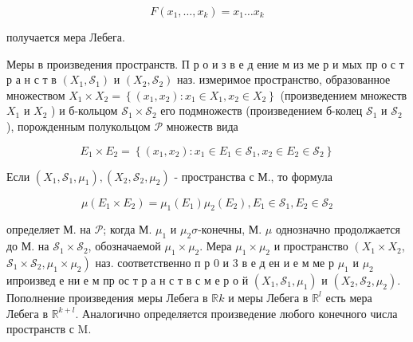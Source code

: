 \documentclass[10pt]{article}
\begin{document}
\[

F\left(x_{1}, \ldots, x_{k}\right)=x_{1} \ldots x_{k}

\]



получается мера Лебега.



Меры в произведения пространств. П р о и з в е д ение м из ме р и мых пр о с т р а н с т в $\left(X_{1}, \mathscr{S}_{1}\right)$ и $\left(X_{2}, \mathscr{S}_{2}\right)$ наз. измеримое пространство, образованное множеством $X_{1} \times X_{2}=\left\{\left(x_{1}, x_{2}\right): x_{1} \in X_{1}, x_{2} \in X_{2}\right\}$ (произведением множеств $X_{1}$ и $X_{2}$ ) и б-кольцом $\mathscr{S}_{1} \times \mathscr{S}_{2}$ его подмножеств (произведением б-колец $\mathscr{S}_{1}$ и $\mathscr{S}_{2}$ ), порожденным полукольцом $\mathscr{P}$ множеств вида



\[

E_{1} \times E_{2}=\left\{\left(x_{1}, x_{2}\right): x_{1} \in E_{1} \in \mathscr{S}_{1}, x_{2} \in E_{2} \in \mathscr{S}_{2}\right\}

\]



Если $\left(X_{1}, \mathscr{S}_{1}, \mu_{1}\right),\left(X_{2}, \mathscr{S}_{2}, \mu_{2}\right)$ - пространства с М., то формула



\[

\mu\left(E_{1} \times E_{2}\right)=\mu_{1}\left(E_{1}\right) \mu_{2}\left(E_{2}\right), E_{1} \in \mathscr{S}_{1}, E_{2} \in \mathscr{S}_{2}

\]



определяет М. на $\mathscr{P}$; когда М. $\mu_{1}$ и $\mu_{2} \sigma$-конечны, М. $\mu$ однозначно продолжается до М. на $\mathscr{S}_{1} \times \mathscr{S}_{2}$, обозначаемой $\mu_{1} \times \mu_{2}$. Мера $\mu_{1} \times \mu_{2}$ и пространство $\left(X_{1} \times X_{2}\right.$, $\left.\mathscr{S}_{1} \times \mathscr{S}_{2}, \mu_{1} \times \mu_{2}\right)$ наз. соответственно п р 0 и 3 в е д ен и е м ме р $\mu_{1}$ и $\mu_{2}$ ипроизвед е ни е м пр ос т р а н с т в с м е р о й $\left(X_{1}, \mathscr{S}_{1}, \mu_{1}\right)$ и $\left(X_{2}, \mathscr{S}_{2}, \mu_{2}\right)$. Пополнение произведения меры Лебега в $\mathbb{R} k$ и меры Лебега в $\mathbb{R}^{l}$ есть мера Лебега в $\mathbb{R}^{k+l}$. Аналогично определяется произведение любого конечного числа пространств с $\mathrm{M}$.
\end{document}
